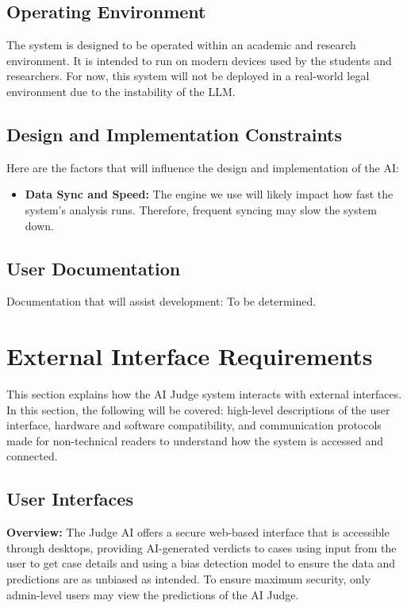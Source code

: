\documentclass[12pt]{article}
\begin{document}
\subsection{Operating Environment}

The system is designed to be operated within an academic and research environment. It is intended to run on modern devices used by the students and researchers. For now, this system will not be deployed in a real-world legal environment due to the instability of the LLM.

\subsection{Design and Implementation Constraints}

Here are the factors that will influence the design and implementation of the AI:

\begin{itemize}
    \item \textbf{Data Sync and Speed:} The engine we use will likely impact how fast the system’s analysis runs. Therefore, frequent syncing may slow the system down.
\end{itemize}

\subsection{User Documentation}

Documentation that will assist development: To be determined.



\section{External Interface Requirements}

This section explains how the AI Judge system interacts with external interfaces. In this section, the following will be covered: high-level descriptions of the user interface, hardware and software compatibility, and communication protocols made for non-technical readers to understand how the system is accessed and connected.

\subsection{User Interfaces}

\textbf{Overview:} The Judge AI offers a secure web-based interface that is accessible through desktops, providing AI-generated verdicts to cases using input from the user to get case details and using a bias detection model to ensure the data and predictions are as unbiased as intended. To ensure maximum security, only admin-level users may view the predictions of the AI Judge.
\end{document}
